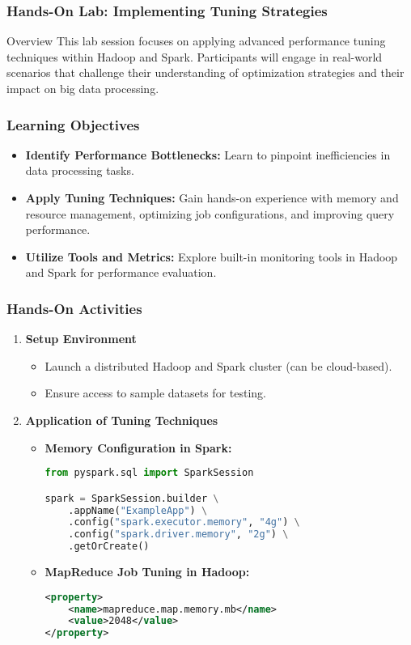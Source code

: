 \documentclass[aspectratio=169]{beamer}
\begin{document}
\begin{frame}[fragile]
    \frametitle{Hands-On Lab: Implementing Tuning Strategies}
    \begin{block}{Overview}
        This lab session focuses on applying advanced performance tuning techniques within Hadoop and Spark. Participants will engage in real-world scenarios that challenge their understanding of optimization strategies and their impact on big data processing.
    \end{block}
\end{frame}

\begin{frame}[fragile]
    \frametitle{Learning Objectives}
    \begin{itemize}
        \item \textbf{Identify Performance Bottlenecks:} Learn to pinpoint inefficiencies in data processing tasks.
        \item \textbf{Apply Tuning Techniques:} Gain hands-on experience with memory and resource management, optimizing job configurations, and improving query performance.
        \item \textbf{Utilize Tools and Metrics:} Explore built-in monitoring tools in Hadoop and Spark for performance evaluation.
    \end{itemize}
\end{frame}

\begin{frame}[fragile]
    \frametitle{Hands-On Activities}
    \begin{enumerate}
        \item \textbf{Setup Environment}
            \begin{itemize}
                \item Launch a distributed Hadoop and Spark cluster (can be cloud-based).
                \item Ensure access to sample datasets for testing.
            \end{itemize}
        \item \textbf{Application of Tuning Techniques}
            \begin{itemize}
                \item \textbf{Memory Configuration in Spark:}
                    \begin{lstlisting}[language=Python]
from pyspark.sql import SparkSession

spark = SparkSession.builder \
    .appName("ExampleApp") \
    .config("spark.executor.memory", "4g") \
    .config("spark.driver.memory", "2g") \
    .getOrCreate()
                    \end{lstlisting}
                \item \textbf{MapReduce Job Tuning in Hadoop:}
                    \begin{lstlisting}[language=XML]
<property>
    <name>mapreduce.map.memory.mb</name>
    <value>2048</value>
</property>
                    \end{lstlisting}
            \end{itemize}
    \end{enumerate}
\end{frame}
\end{document}
